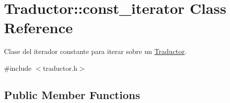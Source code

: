\hypertarget{class_traductor_1_1const__iterator}{}\section{Traductor\+:\+:const\+\_\+iterator Class Reference}
\label{class_traductor_1_1const__iterator}


Clase del iterador constante para iterar sobre un \hyperlink{class_traductor}{Traductor}.  




{\ttfamily \#include $<$traductor.\+h$>$}

\subsection*{Public Member Functions}
